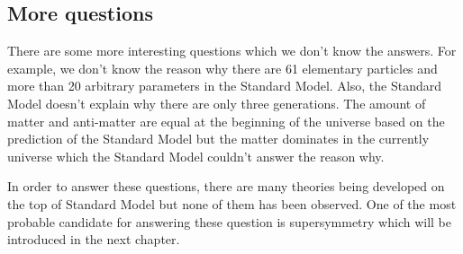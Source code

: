 
\subsection{More questions}
\label{subsec:sm_more_questions}
There are some more interesting questions which we don't know the answers.
For example, we don't know the reason why there are 61 elementary particles and more than 20 arbitrary parameters in the Standard Model.
Also, the Standard Model doesn't explain why there are only three generations.
The amount of matter and anti-matter are equal at the beginning of the universe based on the prediction of the Standard Model but the matter dominates in the currently universe which the Standard Model couldn't answer the reason why.

In order to answer these questions, there are many theories being developed on the top of Standard Model but none of them has been observed.
One of the most probable candidate for answering these question is supersymmetry which will be introduced in the next chapter.
